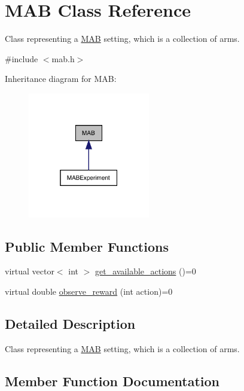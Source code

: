 \hypertarget{class_m_a_b}{}\section{M\+AB Class Reference}
\label{class_m_a_b}


Class representing a \mbox{\hyperlink{class_m_a_b}{M\+AB}} setting, which is a collection of arms.  




{\ttfamily \#include $<$mab.\+h$>$}



Inheritance diagram for M\+AB\+:
\nopagebreak
\begin{figure}[H]
\begin{center}
\leavevmode
\includegraphics[width=151pt]{class_m_a_b__inherit__graph}
\end{center}
\end{figure}
\subsection*{Public Member Functions}
\begin{DoxyCompactItemize}
\item 
virtual vector$<$ int $>$ \mbox{\hyperlink{class_m_a_b_a8323d26ac3720c2f3949298d5f7cf60f}{get\+\_\+available\+\_\+actions}} ()=0
\item 
virtual double \mbox{\hyperlink{class_m_a_b_a83c6ba499e761ea4a246aa7bb790eb46}{observe\+\_\+reward}} (int action)=0
\end{DoxyCompactItemize}


\subsection{Detailed Description}
Class representing a \mbox{\hyperlink{class_m_a_b}{M\+AB}} setting, which is a collection of arms. 

\subsection{Member Function Documentation}
\mbox{\label{class_m_a_b_a8323d26ac3720c2f3949298d5f7cf60f}} 

